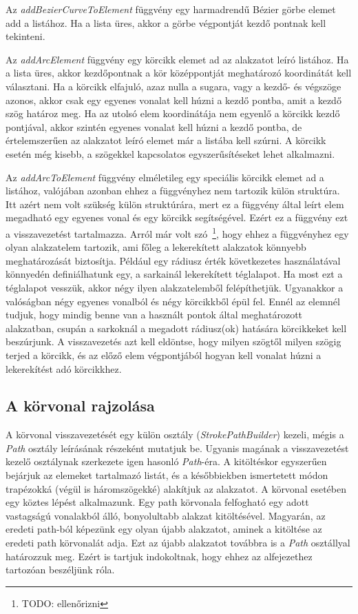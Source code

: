 \documentclass[12pt]{report}
\theoremstyle{definition}
\newcommand{\func}[1]{{\textsl{#1}}}
\begin{document}
Az \func{addBezierCurveToElement} függvény egy harmadrendű Bézier görbe elemet
add a listához. Ha a lista üres, akkor a görbe végpontját kezdő pontnak kell
tekinteni.

Az \func{addArcElement} függvény egy körcikk elemet ad az alakzatot leíró
listához. Ha a lista üres, akkor kezdőpontnak a kör középpontját meghatározó
koordinátát kell választani. Ha a körcikk elfajuló, azaz nulla a sugara, vagy a
kezdő- és végszöge azonos, akkor csak egy egyenes vonalat kell húzni a kezdő
pontba, amit a kezdő szög határoz meg. Ha az utolsó elem koordinátája nem
egyenlő a körcikk kezdő pontjával, akkor szintén egyenes vonalat kell húzni a
kezdő pontba, de értelemszerűen az alakzatot leíró elemet már a listába kell
szúrni. A körcikk esetén még kisebb, a szögekkel kapcsolatos egyszerűsítéseket
lehet alkalmazni.

Az \func{addArcToElement} függvény elméletileg egy speciális körcikk elemet ad
a listához, valójában azonban ehhez a függvényhez nem tartozik külön struktúra.
Itt azért nem volt szükség külön struktúrára, mert ez a függvény által leírt
elem megadható egy egyenes vonal és egy körcikk segítségével. Ezért ez a
függvény ezt a visszavezetést tartalmazza. Arról már volt szó~\footnote{TODO:
ellenőrizni}, hogy ehhez a függvényhez egy olyan alakzatelem tartozik, ami
főleg a lekerekített alakzatok könnyebb meghatározását biztosítja. Például egy
rádiusz érték következetes használatával könnyedén definiálhatunk egy, a
sarkainál lekerekített téglalapot. Ha most ezt a téglalapot vesszük, akkor négy
ilyen alakzatelemből felépíthetjük. Ugyanakkor a valóságban négy egyenes
vonalból és négy körcikkből épül fel. Ennél az elemnél tudjuk, hogy mindig
benne van a használt pontok által meghatározott alakzatban, csupán a sarkoknál
a megadott rádiusz(ok) hatására körcikkeket kell beszúrjunk. A visszavezetés
azt kell eldöntse, hogy milyen szögtől milyen szögig terjed a körcikk, és az
előző elem végpontjából hogyan kell vonalat húzni a lekerekítést adó
körcikkhez.

    \subsection[A körvonal rajzolása]{A körvonal rajzolása}

A körvonal visszavezetését egy külön osztály (\func{StrokePathBuilder}) kezeli,
mégis a \func{Path} osztály leírásának részeként mutatjuk be. Ugyanis magának a
visszavezetést kezelő osztálynak szerkezete igen hasonló \func{Path}-éra. A
kitöltéskor egyszerűen bejárjuk az elemeket tartalmazó listát, és a
későbbiekben ismertetett módon trapézokká (végül is háromszögekké) alakítjuk az
alakzatot. A körvonal esetében egy köztes lépést alkalmazunk. Egy path
körvonala felfogható egy adott vastagságú vonalakból álló, bonyolultabb alakzat
kitöltésével. Magyarán, az eredeti path-ból képezünk egy olyan újabb
alakzatot, aminek a kitöltése az eredeti path körvonalát adja. Ezt az újabb
alakzatot továbbra is a \func{Path} osztállyal határozzuk meg. Ezért is tartjuk
indokoltnak, hogy ehhez az alfejezethez tartozóan beszéljünk róla.
\end{document}
